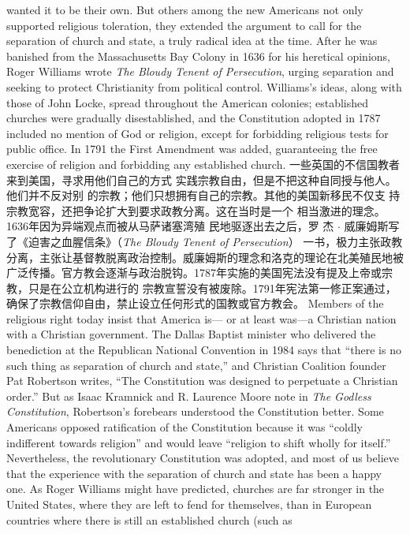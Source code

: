 \begin{paracol}{2}
wanted it to be their own. But others among the new Americans not only supported religious toleration, they extended the
argument to call for the separation of church and state, a truly
radical idea at the time. After he was banished from the Massachusetts Bay Colony in 1636 for his heretical opinions, Roger Williams wrote \textit{The Bloudy Tenent of Persecution}, urging separation and seeking to protect Christianity from political control.
Williams's ideas, along with those of John Locke, spread
throughout the American colonies; established churches were
gradually disestablished, and the Constitution adopted in 1787
included no mention of God or religion, except for forbidding
religious tests for public office. In 1791 the First Amendment
was added, guaranteeing the free exercise of religion and forbidding any established church.
\switchcolumn
一些英国的不信国教者来到美国，寻求用他们自己的方式
实践宗教自由，但是不把这种自同授与他人。他们并不反对别
的宗教；他们只想拥有自己的宗教。其他的美国新移民不仅支
持宗教宽容，还把争论扩大到要求政教分离。这在当时是一个
相当激进的理念。1636年因为异端观点而被从马萨诸塞湾殖
民地驱逐出去之后，罗 杰 $\cdot$ 威廉姆斯写了《迫害之血腥信条》（\textit{The Bloudy Tenent of Persecution}） 一书，极力主张政教分离，主张让基督教脱离政治控制。威廉姆斯的理念和洛克的理论在北美殖民地被广泛传播。官方教会逐渐与政治脱钩。1787年实施的美国宪法没有提及上帝或宗教，只是在公立机构进行的
宗教宣誓没有被废除。1791年宪法第一修正案通过，确保了宗教信仰自由，禁止设立任何形式的国教或官方教会。
\switchcolumn*
Members of the religious right today insist that America is---
or at least was---a Christian nation with a Christian government. The Dallas Baptist minister who delivered the
benediction at the Republican National Convention in 1984
says that ``there is no such thing as separation of church and
state,'' and Christian Coalition founder Pat Robertson writes,
``The Constitution was designed to perpetuate a Christian
order.'' But as Isaac Kramnick and R. Laurence Moore note in
\textit{The Godless Constitution}, Robertson's forebears understood the
Constitution better. Some Americans opposed ratification of
the Constitution because it was ``coldly indifferent towards religion'' and would leave ``religion to shift wholly for itself.'' Nevertheless, the revolutionary Constitution was adopted, and
most of us believe that the experience with the separation of
church and state has been a happy one. As Roger Williams
might have predicted, churches are far stronger in the United
States, where they are left to fend for themselves, than in European countries where there is still an established church (such as

\end{paracol}
